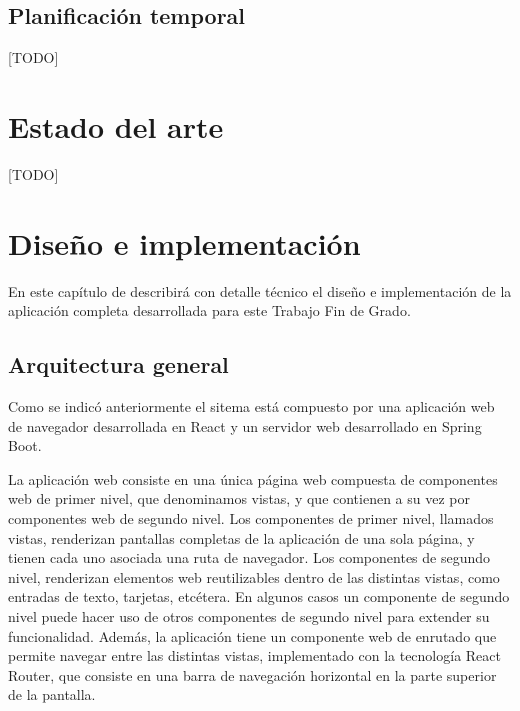 \documentclass[a4paper, 12pt]{book}
\begin{document}
\section{Planificación temporal}
\label{sec:planificacion-temporal}

[TODO]



\cleardoublepage
\chapter{Estado del arte}
\label{chap:estado}

[TODO]



\cleardoublepage
\chapter{Diseño e implementación}

En este capítulo de describirá con detalle técnico el diseño e implementación de la aplicación completa desarrollada para este Trabajo Fin de Grado.

\section{Arquitectura general}
\label{sec:architecture_impl}

Como se indicó anteriormente el sitema está compuesto por una aplicación web de navegador desarrollada en React y un servidor web desarrollado en Spring Boot.

La aplicación web consiste en una única página web compuesta de componentes web de primer nivel, que denominamos vistas, y que contienen a su vez por componentes web de segundo nivel.
Los componentes de primer nivel, llamados vistas, renderizan pantallas completas de la aplicación de una sola página, y tienen cada uno asociada una ruta de navegador.
Los componentes de segundo nivel, renderizan elementos web reutilizables dentro de las distintas vistas, como entradas de texto, tarjetas, etcétera. En algunos casos un componente de segundo nivel puede hacer uso de otros componentes de segundo nivel para extender su funcionalidad.
Además, la aplicación tiene un componente web de enrutado que permite navegar entre las distintas vistas, implementado con la tecnología React Router, que consiste en una barra de navegación horizontal en la parte superior de la pantalla.
\end{document}
